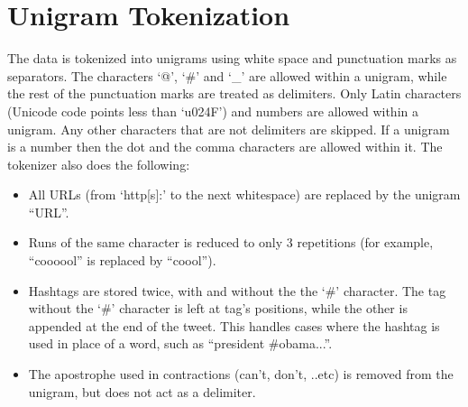\documentclass[letterpaper,12pt,titlepage,oneside,final]{book}
\begin{document}
\chapter[Unigram Tokenization]{Unigram Tokenization}
\label{AppendixA}
The data is tokenized into unigrams using white space and punctuation marks as separators. 
The characters `@', `\#' and `\_' are allowed within a unigram, 
while the rest of the punctuation marks are treated as delimiters. %
Only Latin characters  (Unicode code points less than `u024F') and numbers are allowed within a unigram.
Any other characters that are not delimiters are skipped.
If a unigram is a number then the dot and the comma characters
are allowed within it.
The tokenizer also does the following:
\begin{itemize}
\item All URLs (from `http[s]:' to the next whitespace)  are replaced by the unigram ``URL''. 
\item Runs of the same character is reduced to only 3 repetitions (for example, ``coooool'' is replaced by  ``coool''). 
\item Hashtags are stored twice, with and without the the `\#' character. 
The tag without the `\#' character is left at tag's positions, while the other is appended at the end of the tweet.
This handles cases where the hashtag is used in place of a word, such as ``president \#obama...''.
 \item The apostrophe used in contractions (can't, don't, ..etc) is removed from the unigram, but does not act as a delimiter.%
\end{itemize}

 
\end{document}
